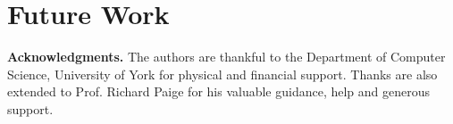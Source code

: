 \documentclass[conference]{IEEEtran}
\begin{document}
\section{Future Work} \label{sec:futurework}





















\noindent\textbf{Acknowledgments.} The authors are thankful to the Department of Computer Science, University of York for physical and financial support. %
Thanks are also extended to Prof. Richard Paige for his valuable guidance, help and generous support.



%

%
%
\end{document}
